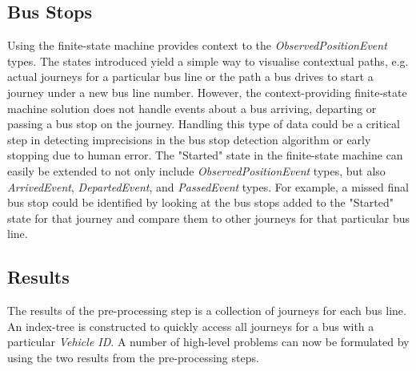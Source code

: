 \subsection{Bus Stops}
Using the finite-state machine provides context to the \textit{ObservedPositionEvent} types.
The states introduced yield a simple way to visualise contextual paths, e.g. actual journeys for a particular bus line or the path a bus drives to start a journey under a new bus line number.
However, the context-providing finite-state machine solution does not handle events about a bus arriving, departing or passing a bus stop on the journey.
Handling this type of data could be a critical step in detecting imprecisions in the bus stop detection algorithm or early stopping due to human error.
The "Started" state in the finite-state machine can easily be extended to not only include \textit{ObservedPositionEvent} types, but also \textit{ArrivedEvent}, \textit{DepartedEvent}, and \textit{PassedEvent} types.
For example, a missed final bus stop could be identified by looking at the bus stops added to the "Started" state for that journey and compare them to other journeys for that particular bus line.

\subsection{Results}
The results of the pre-processing step is a collection of journeys for each bus line.
An index-tree is constructed to quickly access all journeys for a bus with a particular \textit{Vehicle ID}.
A number of high-level problems can now be formulated by using the two results from the pre-processing steps.





